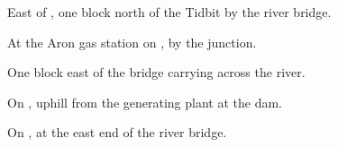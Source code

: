 
\begin{LocationList}

East of , one block north of the Tidbit by the river bridge.

At the Aron gas station on , by the  junction.

One block east of the bridge carrying  across the river.

\Location{\RestArea \Rest}
On , uphill from the generating plant at the dam.

On , at the east end of the river bridge.

\end{LocationList}
